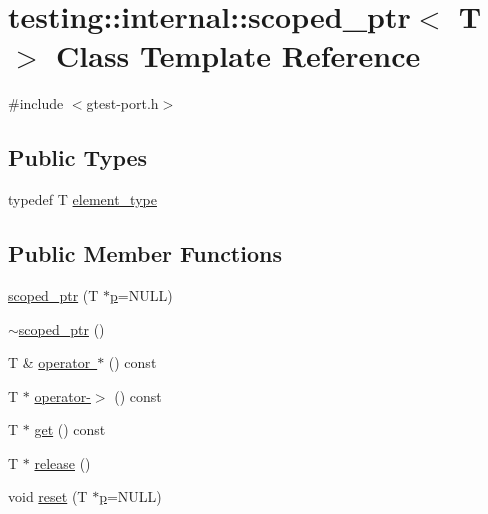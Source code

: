 \hypertarget{classtesting_1_1internal_1_1scoped__ptr}{}\section{testing\+::internal\+::scoped\+\_\+ptr$<$ T $>$ Class Template Reference}
\label{classtesting_1_1internal_1_1scoped__ptr}


{\ttfamily \#include $<$gtest-\/port.\+h$>$}

\subsection*{Public Types}
\begin{DoxyCompactItemize}
\item 
typedef T \mbox{\hyperlink{classtesting_1_1internal_1_1scoped__ptr_ae755ffeebada8e20b68c1d1ffa91cf13}{element\+\_\+type}}
\end{DoxyCompactItemize}
\subsection*{Public Member Functions}
\begin{DoxyCompactItemize}
\item 
\mbox{\hyperlink{classtesting_1_1internal_1_1scoped__ptr_adb972432999a0c63720df148964ac2a5}{scoped\+\_\+ptr}} (T $\ast$\mbox{\hyperlink{_obj__test_2lib_2googletest-master_2googlemock_2test_2gmock-matchers__test_8cc_a6bc6b007533335efe02bafff799ec64c}{p}}=N\+U\+LL)
\item 
\mbox{\hyperlink{classtesting_1_1internal_1_1scoped__ptr_ab721de9bf4369f002fb563e82352ee36}{$\sim$scoped\+\_\+ptr}} ()
\item 
T \& \mbox{\hyperlink{classtesting_1_1internal_1_1scoped__ptr_a50072151dae2c3d7658413093edf567c}{operator $\ast$}} () const
\item 
T $\ast$ \mbox{\hyperlink{classtesting_1_1internal_1_1scoped__ptr_a2b465830a322e2c3ea420e5ccf0472f4}{operator-\/$>$}} () const
\item 
T $\ast$ \mbox{\hyperlink{classtesting_1_1internal_1_1scoped__ptr_aa5984291e12453f1e81b7676d1fa26fd}{get}} () const
\item 
T $\ast$ \mbox{\hyperlink{classtesting_1_1internal_1_1scoped__ptr_a7a4f3e568d81a5d8bcb5f8d6bf5130b1}{release}} ()
\item 
void \mbox{\hyperlink{classtesting_1_1internal_1_1scoped__ptr_acac03266a43359801aff0de5c990bec0}{reset}} (T $\ast$\mbox{\hyperlink{_obj__test_2lib_2googletest-master_2googlemock_2test_2gmock-matchers__test_8cc_a6bc6b007533335efe02bafff799ec64c}{p}}=N\+U\+LL)
\end{DoxyCompactItemize}
